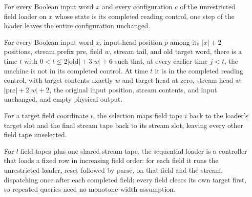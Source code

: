 \begin{lemma}
\label{Complexity.clFresh_idle}
\leanok
{}
For every Boolean input word $x$ and every configuration $c$ of the unrestricted field
loader on $x$ whose state is its completed reading control, one step of the loader
leaves the entire configuration unchanged.
\end{lemma}

\begin{lemma}
\label{Complexity.clFresh_first}
\leanok
{}
For every Boolean input word $x$, input-head position $p$ among its $|x|+2$ positions,
stream prefix $\mathrm{pre}$, field $w$, stream tail, and old target word, there is a
time $t$ with $0<t\le 2|\mathrm{old}|+3|w|+6$ such that, at every earlier time $j<t$,
the machine is not in its completed control. At time $t$ it is in the completed reading
control, with target contents exactly $w$ and target head at zero, stream head at
$|\mathrm{pre}|+2|w|+2$, the original input position, stream contents, and input
unchanged, and empty physical output.
\end{lemma}

\begin{definition}
\label{Complexity.clLoadSelect}
\leanok
{}
For a target field coordinate $i$, the selection maps field tape $i$ back to the loader's target slot and the final stream tape back to its stream slot, leaving every other field tape unselected.
\end{definition}

\begin{definition}
\label{Complexity.clLoadTM}
\leanok
{}
For $l$ field tapes plus one shared stream tape, the sequential loader is a controller that loads a fixed row in increasing field order: for each field it runs the unrestricted loader, reset followed by parse, on that field and the stream, dispatching once after each completed field; every field clears its own target first, so repeated queries need no monotone-width assumption.
\end{definition}

